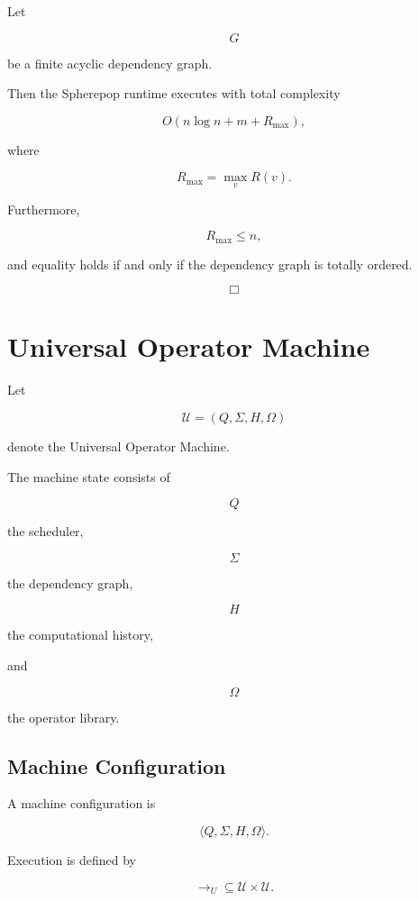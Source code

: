 \documentclass[12pt,oneside]{article}
\theoremstyle{definition}
\theoremstyle{remark}
\begin{document}
Let

\[
G
\]

be a finite acyclic dependency graph.

Then the Spherepop runtime executes with total complexity

\[
O
(
n\log n
+
m
+
R_{\max}
),
\]

where

\[
R_{\max}
=
\max_v
R(v).
\]

Furthermore,

\[
R_{\max}
\le
n,
\]

and equality holds if and only if the dependency graph is totally ordered.

\[
\Box
\]

\section{Universal Operator Machine}

Let

\[
\mathcal U
=
(Q,\Sigma,H,\Omega)
\]

denote the Universal Operator Machine.

The machine state consists of

\[
Q
\]

the scheduler,

\[
\Sigma
\]

the dependency graph,

\[
H
\]

the computational history,

and

\[
\Omega
\]

the operator library.

\subsection*{Machine Configuration}

A machine configuration is

\[
\langle
Q,
\Sigma,
H,
\Omega
\rangle .
\]

Execution is defined by

\[
\longrightarrow_U
\subseteq
\mathcal U
\times
\mathcal U.
\]

\end{document}
